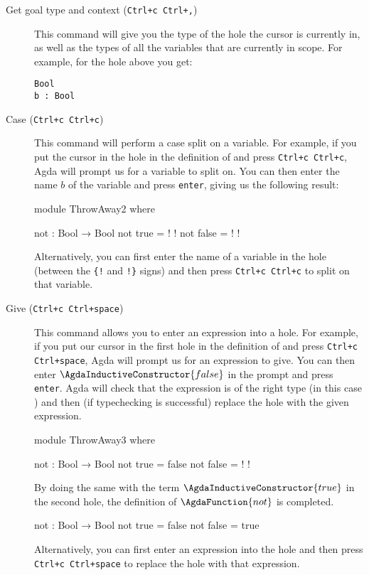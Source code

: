 \documentclass[a4paper,UKenglish]{tufte-handout}
\theoremstyle{definition}
\newcommand\var[1]{\mathit{#1}}
\newcommand\fun[1]{{\AgdaFunction{#1}}}
\newcommand\data[1]{{\AgdaFunction{#1}}}
\newcommand\con[1]{{\AgdaInductiveConstructor{#1}}}
\newcommand\true{\con{true}}
\newcommand\false{\con{false}}
\begin{document}
\begin{description}
\item[Get goal type and context (\texttt{Ctrl+c Ctrl+,})] This command
  will give you the type of the hole the cursor is currently in, as
  well as the types of all the variables that are currently in
  scope. For example, for the hole above you get:
\begin{verbatim}
Bool
b : Bool
\end{verbatim}
\item[Case (\texttt{Ctrl+c Ctrl+c})] This command will perform a case
  split on a variable. For example, if you put the cursor in the hole
  in the definition of \fun{not} and press \texttt{Ctrl+c Ctrl+c},
  Agda will prompt us for a variable to split on. You can then
  enter the name $\var{b}$ of the variable and press \texttt{enter},
  giving us the following result:
\begin{code}[hide]
module ThrowAway2 where
\end{code}
\begin{code}[number]
  not : Bool → Bool
  not true   = {!  !}
  not false  = {!  !}
\end{code}
  Alternatively, you can first enter the name of a variable in
  the hole (between the \texttt{\{!} and \texttt{!\}} signs)
  and then press \texttt{Ctrl+c Ctrl+c} to split on that variable.
\item[Give (\texttt{Ctrl+c Ctrl+space})] This command allows
  you to enter an expression into a hole. For example, if you put
  our cursor in the first hole in the definition of \fun{not}
  and press \texttt{Ctrl+c Ctrl+space}, Agda will prompt us
  for an expression to give. You can then enter $\false$ in
  the prompt and press \texttt{enter}. Agda will check that the
  expression is of the right type (in this case \data{Bool}) and
  then (if typechecking is successful) replace the hole with the given
  expression.
  \begin{code}[hide]
module ThrowAway3 where
\end{code}%
\begin{code}[number]
  not  : Bool → Bool
  not  true   = false
  not  false  = {!  !}
\end{code}
  By doing the same with the term $\true$ in the second hole,
  the definition of $\fun{not}$ is completed.
\begin{code}[hide]
not  : Bool → Bool
not  true   = false
not  false  = true
\end{code}
  Alternatively, you can first enter an expression into
  the hole and then
  press \texttt{Ctrl+c Ctrl+space} to replace the hole with that expression.


\end{description}
\end{document}
